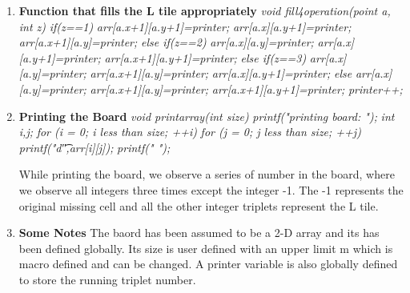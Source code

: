 \documentclass[a4paper,11pt]{article}
\begin{document}
\begin{enumerate}
\item \textbf{Function that fills the L tile appropriately} \newline
\emph{	void fill4operation(point a, int z)} \newline
\emph{		if(z==1)} \newline
\emph{			arr[a.x+1][a.y+1]=printer;} \newline
\emph{			arr[a.x][a.y+1]=printer;} \newline
\emph{			arr[a.x+1][a.y]=printer;} \newline
\emph{		else if(z==2)} \newline
\emph{			arr[a.x][a.y]=printer;} \newline
\emph{			arr[a.x][a.y+1]=printer;} \newline
\emph{			arr[a.x+1][a.y+1]=printer;} \newline
\emph{		else if(z==3)} \newline
\emph{			arr[a.x][a.y]=printer;} \newline
\emph{			arr[a.x+1][a.y]=printer;} \newline
\emph{			arr[a.x][a.y+1]=printer;} \newline
\emph{		else} \newline
\emph{			arr[a.x][a.y]=printer;} \newline
\emph{			arr[a.x+1][a.y]=printer;} \newline
\emph{			arr[a.x+1][a.y+1]=printer;} \newline
\emph{		printer++;}


\item \textbf{Printing the Board} \newline
\emph{	void printarray(int size)} \newline
\emph{		printf("printing board: ");} \newline
\emph{		int i,j;} \newline
\emph{		for (i = 0; i less than size; ++i)} \newline
\emph{			for (j = 0; j less than size; ++j)} \newline
\emph{			printf("d\t",arr[i][j]);} \newline
\emph{			printf(" ");}

While printing the board, we observe a series of number in the board, where we observe all integers three times except the integer -1. The -1 represents the original missing cell and all the other integer triplets represent the L tile.

\item \textbf{Some Notes}
The baord has been assumed to be a 2-D array and its has been defined globally. Its size is user defined with an upper limit m which is macro defined and can be changed. A printer variable is also globally defined to store the running triplet number.


\end{enumerate}
\end{document}
